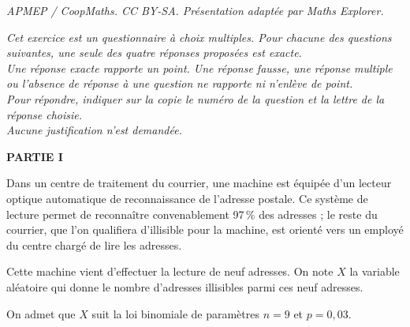 \documentclass[10pt]{article}
\begin{document}
\noindent\textit{APMEP / CoopMaths. CC BY-SA. Présentation adaptée par Maths Explorer.}\par\medskip
\medskip

\emph{Cet exercice est un questionnaire à choix multiples. Pour chacune des questions suivantes, une seule des quatre réponses proposées est exacte.\\ Une réponse exacte rapporte un point. Une réponse fausse, une réponse multiple ou l'absence de réponse à une question ne rapporte ni n'enlève de point.\\ Pour répondre, indiquer sur la copie le numéro de la question et la lettre de la réponse choisie.\\ Aucune justification n'est demandée.}

\bigskip

\textbf{PARTIE I}

\medskip

Dans un centre de traitement du courrier, une machine est équipée d'un lecteur optique automatique de reconnaissance de l'adresse postale. Ce système de lecture permet de reconnaître convenablement 97\,\% des adresses ; le reste du courrier, que l'on qualifiera d'illisible pour la machine, est orienté vers un employé du centre chargé de lire les adresses. 

Cette machine vient d'effectuer la lecture de neuf adresses. On note $X$ la variable aléatoire qui donne le nombre d'adresses illisibles parmi ces neuf adresses.

On admet que $X$ suit la loi binomiale de paramètres $n = 9$ et $p = 0,03$.

\medskip
\end{document}
